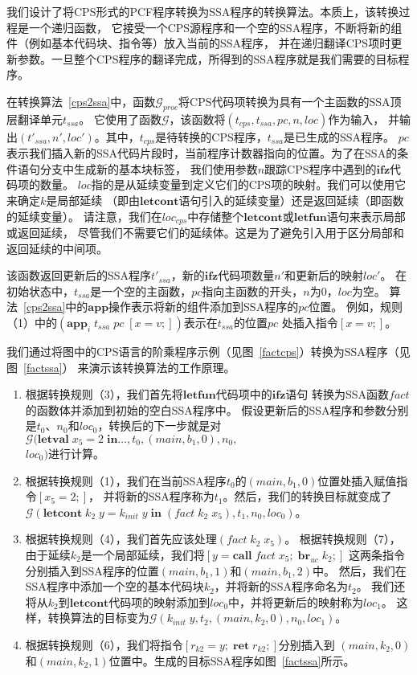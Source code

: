 我们设计了将CPS形式的PCF程序转换为SSA程序的转换算法。本质上，该转换过程是一个递归函数，
它接受一个CPS源程序和一个空的SSA程序，不断将新的组件（例如基本代码块、指令等）放入当前的SSA程序，
并在递归翻译CPS项时更新参数。一旦整个CPS程序的翻译完成，所得到的SSA程序就是我们需要的目标程序。

在转换算法~\ref{cps2ssa}中，函数$\mathcal{G}_{proc}$将CPS代码项转换为具有一个主函数的SSA顶层翻译单元$t_{ssa}$。
它使用了函数$\mathcal{G}$，该函数将$(t_{cps}, t_{ssa}, pc, n, loc)$作为输入，
并输出$(t'_{ssa}, n', loc')$。其中，$t_{cps}$是待转换的CPS程序，$t_{ssa}$是已生成的SSA程序。
$pc$表示我们插入新的SSA代码片段时，当前程序计数器指向的位置。为了在SSA的条件语句分支中生成新的基本块标签，
我们使用参数$n$跟踪CPS程序中遇到的$\mathbf{ifz}$代码项的数量。
$loc$指的是从延续变量到定义它们的CPS项的映射。我们可以使用它来确定$k$是局部延续
（即由$\mathbf{letcont}$语句引入的延续变量）还是返回延续（即函数的延续变量）。
请注意，我们在$loc_{cps}$中存储整个$\mathbf{letcont}$或$\mathbf{letfun}$语句来表示局部或返回延续，
尽管我们不需要它们的延续体。这是为了避免引入用于区分局部和返回延续的中间项。

该函数返回更新后的SSA程序$t'_{ssa}$，新的$\mathbf{ifz}$代码项数量$n'$和更新后的映射$loc'$。
在初始状态中，$t_{ssa}$是一个空的主函数，$pc$指向主函数的开头，$n$为0，$loc$为空。
算法~\ref{cps2ssa}中的$\mathbf{app}$操作表示将新的组件添加到SSA程序的$pc$位置。
例如，规则（1）中的$(\mathbf{app}_i\; t_{ssa}\; pc\; [x=v;])$表示在$t_{ssa}$的位置$pc$
处插入指令$[x=v;]$。

我们通过将图中的CPS语言的阶乘程序示例（见图~\ref{factcps}）转换为SSA程序（见图~\ref{factssa}）
来演示该转换算法的工作原理。
\begin{enumerate}[label={(\alph*)}]
    \item 根据转换规则（3），我们首先将$\mathbf{letfun}$代码项中的$\mathbf{ifz}$语句
        转换为SSA函数$fact$的函数体并添加到初始的空白SSA程序中。
        假设更新后的SSA程序和参数分别是$t_0$、$n_0$和$loc_0$，转换后的下一步就是对
        $\mathcal{G}(\mathbf{letval}\; x_5=2\; \mathbf{in}\dots, t_0, (main,b_1,0), n_0,$ \\ $loc_0)$进行计算。   
    \item 根据转换规则（1），我们在当前SSA程序$t_0$的$(main,b_1,0)$位置处插入赋值指令$[x_5=2;]$，
        并将新的SSA程序称为$t_1$。然后，我们的转换目标就变成了
        $\mathcal{G}(\mathbf{letcont}\; k_2\; y=k_{init}\; y\; \mathbf{in}\; (fact\; k_2\; x_5), t_1, n_0, loc_0)$。
    \item 根据转换规则（4），我们首先应该处理$(fact\; k_2\; x_5)$。
        根据转换规则（7），由于延续$k_2$是一个局部延续，我们将$[y = \mathbf{call}\; fact\; x_5;\; \mathbf{br}_{uc}\; k_2;]$
        这两条指令分别插入到SSA程序的位置$(main,b_1,1)$和$(main,b_1,2)$中。
        然后，我们在SSA程序中添加一个空的基本代码块$k_2$，并将新的SSA程序命名为$t_2$。
        我们还将从$k_2$到$\mathbf{letcont}$代码项的映射添加到$loc_0$中，并将更新后的映射称为$loc_1$。
        这样，转换算法的目标变为$\mathcal{G}(k_{init}\; y, t_2, (main,k_2,0), n_0, loc_1)$。
    \item 根据转换规则（6），我们将指令$[r_{k2} = y;\; \mathbf{ret}\; r_{k2};]$分别插入到
        $(main,k_2,0)$和$(main,k_2,1)$位置中。生成的目标SSA程序如图~\ref{factssa}所示。
\end{enumerate}
